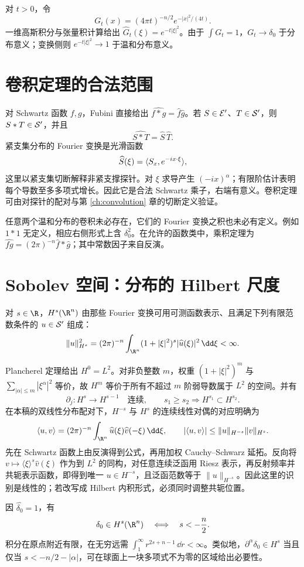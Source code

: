 \begin{example}[高斯]
对 $t>0$，令
\[
 G_t(x)=(4\pi t)^{-n/2}e^{-|x|^2/(4t)}.
\]
一维高斯积分与张量积计算给出 $\widehat G_t(\xi)=e^{-t|\xi|^2}$。由于 $\int G_t=1$，$G_t\to\delta_0$ 于分布意义；变换侧则 $e^{-t|\xi|^2}\to1$ 于温和分布意义。
\end{example}

\section{卷积定理的合法范围}
对 Schwartz 函数 $f,g$，Fubini 直接给出 $\widehat{f*g}=\widehat f\widehat g$。若 $S\in\mathcal{E}'$、$T\in\mathcal{S}'$，则 $S*T\in\mathcal{S}'$，并且
\begin{equation}\label{eq:convolution-fourier}
 \widehat{S*T}=\widehat S\,\widehat T.
\end{equation}
紧支集分布的 Fourier 变换是光滑函数
\[
 \widehat S(\xi)=\langle S_x,e^{-ix\cdot\xi}\rangle,
\]
这里以紧支集切断解释非紧支撑探针。对 $\xi$ 求导产生 $(-ix)^\alpha$；有限阶估计表明每个导数至多多项式增长。因此它是合法 Schwartz 乘子，右端有意义。卷积定理可由对探针的配对与第 \ref{ch:convolution} 章的切断定义验证。

任意两个温和分布的卷积未必存在，它们的 Fourier 变换之积也未必有定义。例如 $1*1$ 无定义，相应右侧形式上含 $\delta_0^2$。在允许的函数类中，乘积定理为 $\widehat{fg}=(2\pi)^{-n}\widehat f*\widehat g$；其中常数因子来自反演。

\section{Sobolev 空间：分布的 Hilbert 尺度}
\begin{definition}
对 $s\in\R$，$H^s(\R^n)$ 由那些 Fourier 变换可用可测函数表示、且满足下列有限范数条件的 $u\in\mathcal{S}'$ 组成：
\[
 \|u\|_{H^s}^2=(2\pi)^{-n}\int_{\R^n}
 (1+|\xi|^2)^s|\widehat u(\xi)|^2\,\dd\xi<\infty.
\]
\end{definition}
Plancherel 定理给出 $H^0=L^2$。对非负整数 $m$，权重 $(1+|\xi|^2)^m$ 与 $\sum_{|\alpha|\le m}|\xi^\alpha|^2$ 等价，故 $H^m$ 等价于所有不超过 $m$ 阶弱导数属于 $L^2$ 的空间。并有
\[
 \partial_j:H^s\to H^{s-1}\quad\text{连续},\qquad
 s_1\ge s_2\Rightarrow H^{s_1}\subset H^{s_2}.
\]
在本稿的双线性分布配对下，$H^{-s}$ 与 $H^s$ 的连续线性对偶的对应明确为
\[
 \langle u,v\rangle=(2\pi)^{-n}\int_{\R^n}
 \widehat u(\xi)\widehat v(-\xi)\,\dd\xi,
 \qquad |\langle u,v\rangle|\le\|u\|_{H^{-s}}\|v\|_{H^s}.
\]
先在 Schwartz 函数上由反演得到公式，再用加权 Cauchy--Schwarz 延拓。反向将 $v\mapsto\langle\xi\rangle^s\widehat v(\xi)$ 作为到 $L^2$ 的同构，对任意连续泛函用 Riesz 表示，再反射频率并共轭表示函数，即得到唯一 $u\in H^{-s}$，且泛函范数等于 $\|u\|_{H^{-s}}$。因此这里的识别是线性的；若改写成 Hilbert 内积形式，必须同时调整共轭位置。
\begin{example}[点质量的正则性门槛]
因 $\widehat{\delta_0}=1$，有
\[
 \delta_0\in H^s(\R^n)\quad\Longleftrightarrow\quad s<-\frac n2.
\]
积分在原点附近有限，在无穷远需 $\int_1^\infty r^{2s+n-1}\,\dd r<\infty$。类似地，$\partial^\alpha\delta_0\in H^s$ 当且仅当 $s<-n/2-|\alpha|$，可在球面上一块多项式不为零的区域给出必要性。
\end{example}

